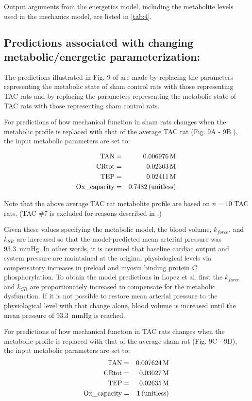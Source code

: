 \documentclass[fleqn,10pt]{physiome}
\begin{document}
Output arguments from the energetics model, including the metabolite levels used in the mechanics model, are listed in \autoref{tab:4}.

\subsection{Predictions associated with changing metabolic/energetic parameterization:}

The predictions illustrated in Fig. 9 of \cite{Lopez2020} are made by replacing the parameters representing the metabolic state of sham control rats with those representing TAC rats and by replacing the parameters representing the metabolic state of TAC rats with those representing sham control rats. 

For predictions of how mechanical function in sham rats changes when the metabolic profile is replaced with that of the average TAC rat (Fig. 9A - 9B \cite{Lopez2020}), the input metabolic parameters are set to:

\begin{eqnarray}
  {\rm TAN}   &=& 0.006976 \,  {\rm M} \nonumber \\
  {\rm CRtot} &=& 0.02303 \,  {\rm M} \nonumber \\
  {\rm TEP}   &=& 0.02411 \,  {\rm M} \nonumber \\
  {\rm Ox\_capacity} &=& 0.7482 \,  {\rm (unitless)} \nonumber
\end{eqnarray}

Note that the above average TAC rat metabolite profile are based on $n = 10$ TAC rats. (TAC \#7 is excluded for reasons described in \cite{Lopez2020}.)

Given these values specifying the metabolic model, the blood volume, $k_{force}$, and $k_{SR}$ are increased so that the model-predicted mean arterial pressure was 93.3~mmHg. In other words, it is assumed that baseline cardiac output and system pressure are maintained at the original physiological levels via compensatory increases in preload and myosin binding protein C phosphorylation. To obtain the model predictions in Lopez et al. first the $k_{force}$ and $k_{SR}$ are proportionately increased to compensate for the metabolic dysfunction. If it is not possible to restore mean arterial pressure to the physiological level with that change alone, blood volume is increased until the mean pressure of 93.3~mmHg is reached.

For predictions of how mechanical function in TAC rats changes when the metabolic profile is replaced with that of the average sham rat (Fig. 9C - 9D), the input metabolic parameters are set to:
\begin{eqnarray}
  {\rm TAN}   &=& 0.007624 \,  {\rm M} \nonumber \\
  {\rm CRtot} &=& 0.03027 \, {\rm M} \nonumber \\ 
  {\rm TEP}   &=& 0.02635 \, {\rm M} \nonumber \\
  {\rm Ox\_capacity} &=& 1 \, {\rm (unitless)} \nonumber
\end{eqnarray}
\end{document}

